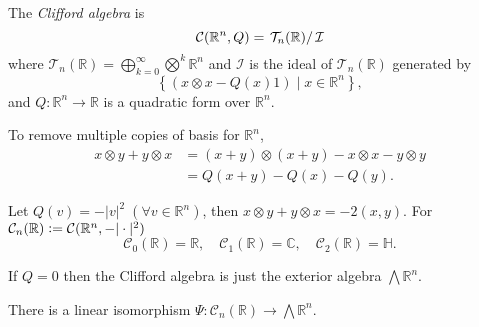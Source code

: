 \documentclass[11pt]{homework}
\begin{document}
\begin{definition}

    The \textit{Clifford algebra} is
    \begin{equation*}
        \mathcal{C} (\mathbb{R}^n, Q) = \left. \mathcal{T}_{n}(\mathbb{R}) \right/ \mathcal{I}
    \end{equation*}
    where $\mathcal{T}_{n}(\mathbb{R}) = \bigoplus_{k=0}^{\infty} \bigotimes^k \mathbb{R}^{n} $ and $\mathcal{I}$ is the ideal of $\mathcal{T}_{n}(\mathbb{R})$ generated by
    \begin{equation*}
        \left\{\left(x \otimes x - Q(x)1\right) \mid x \in \mathbb{R}^{n}\right\},
    \end{equation*}
    and $Q: \mathbb{R}^{n} \rightarrow \mathbb{R}$ is a quadratic form over $\mathbb{R}^{n}$.
\end{definition}

\begin{remark}
    To remove multiple copies of basis for $\mathbb{R}^n$, 
    \begin{align*}
        x \otimes y + y \otimes x &= (x + y)\otimes(x + y) - x \otimes x - y \otimes y \\
        &= Q(x + y) - Q(x) - Q(y).
    \end{align*}
\end{remark}

\begin{remark}
    Let $Q(v) = - |v|^2 \; (\forall v \in \mathbb{R}^n)$, then $x \otimes y + y \otimes x = -2 (x,y)$. For $\mathcal{C}_n(\mathbb{R}) \vcentcolon = \mathcal{C} (\mathbb{R}^n, - |\cdot|^2)$
    \begin{equation*}
        \mathcal{C}_0 (\mathbb{R}) = \mathbb{R}, \quad \mathcal{C}_1 (\mathbb{R}) = \mathbb{C}, \quad \mathcal{C}_2 (\mathbb{R}) = \mathbb{H}.
    \end{equation*}
\end{remark}

\begin{remark}
    If $Q = 0$ then the Clifford algebra is just the exterior algebra $\bigwedge \mathbb{R}^n$.
\end{remark}

\begin{proposition}
    There is a linear isomorphism $\Psi : \mathcal{C}_n (\mathbb{R}) \rightarrow \bigwedge \mathbb{R}^n$.
\end{proposition}
\end{document}
